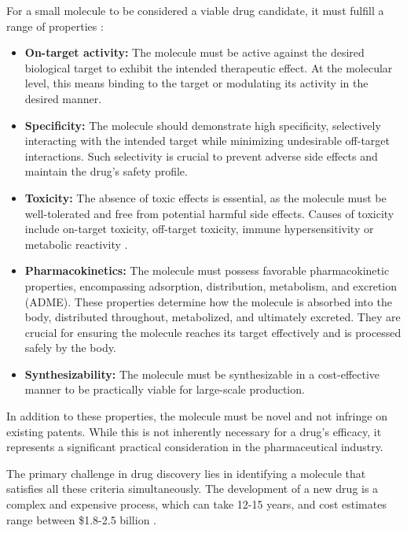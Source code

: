For a small molecule to be considered a viable drug candidate, it must fulfill a range of properties
\citep{hughesPrinciplesEarlyDrug2011,benderArtificialIntelligenceDrug2021,southeyIntroductionSmallMolecule2023}:
\begin{itemize}
	\item \textbf{On-target activity:} The molecule must be active against the desired biological target to exhibit
	      the intended therapeutic effect. At the molecular level, this means binding to the target or
	      modulating its activity in the desired manner.
	\item \textbf{Specificity:} The molecule should demonstrate high specificity, selectively
	      interacting with the intended target while minimizing undesirable off-target interactions. Such
	      selectivity is crucial to prevent adverse side effects and maintain the drug's safety profile.
	\item \textbf{Toxicity:} The absence of toxic effects is essential, as the molecule must be
	      well-tolerated and free from potential harmful side effects. Causes of toxicity include
	      on-target toxicity, off-target toxicity, immune hypersensitivity or metabolic reactivity
	      \citep{guengerichMechanismsDrugToxicity2011}.
	\item \textbf{Pharmacokinetics:} The molecule must possess favorable pharmacokinetic properties,
	      encompassing adsorption, distribution, metabolism, and excretion (ADME). These properties determine
	      how the molecule is absorbed into the body, distributed throughout, metabolized, and ultimately
	      excreted. They are crucial for ensuring the molecule reaches its target effectively and is processed
	      safely by the body.
	\item \textbf{Synthesizability:} The molecule must be synthesizable in a cost-effective manner to be
	      practically viable for large-scale production.
\end{itemize}

In addition to these properties, the molecule must be novel and not infringe on existing patents.
While this is not inherently necessary for a drug's efficacy, it represents a significant practical
consideration in the pharmaceutical industry.

The primary challenge in drug discovery lies in identifying a molecule that satisfies all these
criteria simultaneously. The development of a new drug is a complex and expensive process, which can
take 12-15 years, and cost estimates range between \$1.8-2.5 billion \citep{hughesPrinciplesEarlyDrug2011,paulHowImproveProductivity2010,dimasiInnovationPharmaceuticalIndustry2016}.

